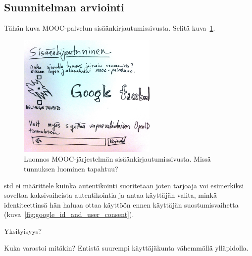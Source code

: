 \documentclass[finnish,gradu]{tktltiki}
\begin{document}



  \subsection{Suunnitelman arviointi} %
  \label{sub:suunnitelman_arviointi}

  Tähän kuva MOOC-palvelun sisäänkirjautumissivusta. Selitä kuva~\ref{fig:mooc_login_luonnos}.
  \begin{figure}
    \centering
    \includegraphics[width=0.6\textwidth]{images/mooc_login_sketch.jpg}
    \caption{Luonnos MOOC-järjestelmän sisäänkirjautumissivusta. Missä tunnuksen luominen tapahtuu?}
    \label{fig:mooc_login_luonnos}
  \end{figure}



  std ei määrittele kuinka autentikointi suoritetaan
  joten tarjoaja voi esimerkiksi soveltaa kaksivaiheista autentikointia ja antaa käyttäjän valita, minkä identiteettinsä hän haluaa ottaa käyttöön ennen käyttäjän suostumisvaihetta (kuva~\ref{fig:google_id_and_user_consent}).



  Yksityisyys? %

  Kuka varastoi mitäkin? Entistä suurempi käyttäjäkunta vähemmällä ylläpidolla.
\end{document}
